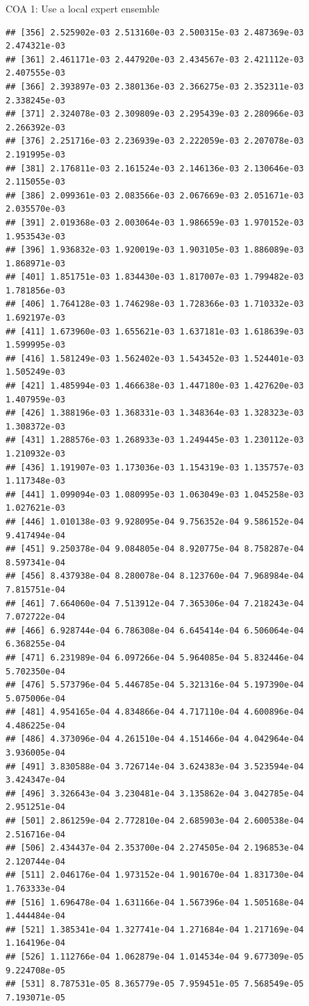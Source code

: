 \documentclass[ignorenonframetext,]{beamer}
\begin{document}
\begin{frame}[fragile]{COA 1: Use a local expert ensemble}
\begin{verbatim}
## [356] 2.525902e-03 2.513160e-03 2.500315e-03 2.487369e-03 2.474321e-03
## [361] 2.461171e-03 2.447920e-03 2.434567e-03 2.421112e-03 2.407555e-03
## [366] 2.393897e-03 2.380136e-03 2.366275e-03 2.352311e-03 2.338245e-03
## [371] 2.324078e-03 2.309809e-03 2.295439e-03 2.280966e-03 2.266392e-03
## [376] 2.251716e-03 2.236939e-03 2.222059e-03 2.207078e-03 2.191995e-03
## [381] 2.176811e-03 2.161524e-03 2.146136e-03 2.130646e-03 2.115055e-03
## [386] 2.099361e-03 2.083566e-03 2.067669e-03 2.051671e-03 2.035570e-03
## [391] 2.019368e-03 2.003064e-03 1.986659e-03 1.970152e-03 1.953543e-03
## [396] 1.936832e-03 1.920019e-03 1.903105e-03 1.886089e-03 1.868971e-03
## [401] 1.851751e-03 1.834430e-03 1.817007e-03 1.799482e-03 1.781856e-03
## [406] 1.764128e-03 1.746298e-03 1.728366e-03 1.710332e-03 1.692197e-03
## [411] 1.673960e-03 1.655621e-03 1.637181e-03 1.618639e-03 1.599995e-03
## [416] 1.581249e-03 1.562402e-03 1.543452e-03 1.524401e-03 1.505249e-03
## [421] 1.485994e-03 1.466638e-03 1.447180e-03 1.427620e-03 1.407959e-03
## [426] 1.388196e-03 1.368331e-03 1.348364e-03 1.328323e-03 1.308372e-03
## [431] 1.288576e-03 1.268933e-03 1.249445e-03 1.230112e-03 1.210932e-03
## [436] 1.191907e-03 1.173036e-03 1.154319e-03 1.135757e-03 1.117348e-03
## [441] 1.099094e-03 1.080995e-03 1.063049e-03 1.045258e-03 1.027621e-03
## [446] 1.010138e-03 9.928095e-04 9.756352e-04 9.586152e-04 9.417494e-04
## [451] 9.250378e-04 9.084805e-04 8.920775e-04 8.758287e-04 8.597341e-04
## [456] 8.437938e-04 8.280078e-04 8.123760e-04 7.968984e-04 7.815751e-04
## [461] 7.664060e-04 7.513912e-04 7.365306e-04 7.218243e-04 7.072722e-04
## [466] 6.928744e-04 6.786308e-04 6.645414e-04 6.506064e-04 6.368255e-04
## [471] 6.231989e-04 6.097266e-04 5.964085e-04 5.832446e-04 5.702350e-04
## [476] 5.573796e-04 5.446785e-04 5.321316e-04 5.197390e-04 5.075006e-04
## [481] 4.954165e-04 4.834866e-04 4.717110e-04 4.600896e-04 4.486225e-04
## [486] 4.373096e-04 4.261510e-04 4.151466e-04 4.042964e-04 3.936005e-04
## [491] 3.830588e-04 3.726714e-04 3.624383e-04 3.523594e-04 3.424347e-04
## [496] 3.326643e-04 3.230481e-04 3.135862e-04 3.042785e-04 2.951251e-04
## [501] 2.861259e-04 2.772810e-04 2.685903e-04 2.600538e-04 2.516716e-04
## [506] 2.434437e-04 2.353700e-04 2.274505e-04 2.196853e-04 2.120744e-04
## [511] 2.046176e-04 1.973152e-04 1.901670e-04 1.831730e-04 1.763333e-04
## [516] 1.696478e-04 1.631166e-04 1.567396e-04 1.505168e-04 1.444484e-04
## [521] 1.385341e-04 1.327741e-04 1.271684e-04 1.217169e-04 1.164196e-04
## [526] 1.112766e-04 1.062879e-04 1.014534e-04 9.677309e-05 9.224708e-05
## [531] 8.787531e-05 8.365779e-05 7.959451e-05 7.568549e-05 7.193071e-05

\end{verbatim}
\end{frame}
\end{document}
